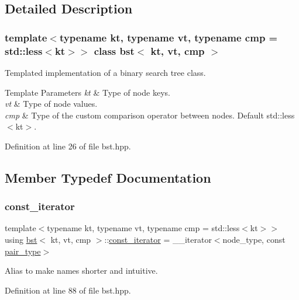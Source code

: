 \subsection{Detailed Description}
\subsubsection*{template$<$typename kt, typename vt, typename cmp = std\+::less$<$kt$>$$>$\newline
class bst$<$ kt, vt, cmp $>$}

Templated implementation of a binary search tree class. 


\begin{DoxyTemplParams}{Template Parameters}
{\em kt} & Type of node keys. \\
\hline
{\em vt} & Type of node values. \\
\hline
{\em cmp} & Type of the custom comparison operator between nodes. Default std\+::less$<$kt$>$. \\
\hline
\end{DoxyTemplParams}


Definition at line 26 of file bst.\+hpp.



\subsection{Member Typedef Documentation}
\mbox{\label{classbst_a72485696d999bf489c6156f6327a2163}} 
\subsubsection{\texorpdfstring{const\+\_\+iterator}{const\_iterator}}
{\footnotesize\ttfamily template$<$typename kt, typename vt, typename cmp = std\+::less$<$kt$>$$>$ \\
using \hyperlink{classbst}{bst}$<$ kt, vt, cmp $>$\+::\hyperlink{classbst_a72485696d999bf489c6156f6327a2163}{const\+\_\+iterator} =  \+\_\+\+\_\+iterator$<$node\+\_\+type, const \hyperlink{classbst_a7b11cca2a3b4394915600194f741ab16}{pair\+\_\+type}$>$}

Alias to make names shorter and intuitive. 

Definition at line 88 of file bst.\+hpp.

\mbox{\label{classbst_a429b0445783ff6486882db5dee900ce0}} 

